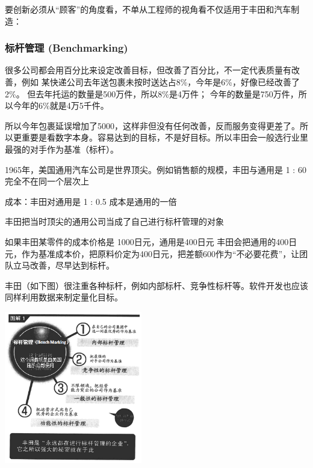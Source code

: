 要创新必须从``顾客''的角度看，不单从工程师的视角看不仅适用于丰田和汽车制造：


\hypertarget{ux6807ux6746ux7ba1ux7406-benchmarking}{%
\subsubsection{标杆管理
(Benchmarking)}\label{ux6807ux6746ux7ba1ux7406-benchmarking}}

很多公司都会用百分比来设定改善目标，但改善了百分比，不一定代表质量有改善，例如
某快递公司去年送包裹未按时送达占8\%，今年是6\%，好像已经改善了2\%。
但去年托运的数量是500万件，所以8\%是4万件；
今年的数量是750万件，所以今年的6\%就是4万5千件。

所以今年包裹延误增加了5000，这样非但没有任何改善，反而服务变得更差了。所以更重要是看数字本身。容易达到的目标，不是好目标。所以丰田会一般选行业里最强的对手作为基准（标杆）。

1965年，美国通用汽车公司是世界顶尖。例如销售额的规模，丰田与通用是 1
: 60 完全不在同一个层次上

成本：丰田对通用是 1 : 0.5 成本是通用的一倍

丰田把当时顶尖的通用公司当成了自己进行标杆管理的对象

如果丰田某零件的成本价格是 1000日元，通用是400日元
丰田会把通用的400日元，作为基准成本价，把原料价定为400日元，把差额600作为``不必要花费''，让团队立马改善，尽早达到标杆。

丰田（如下图）很注重各种标杆，例如内部标杆、竞争性标杆等。软件开发也应该同样利用数据来制定量化目标。

\includegraphics[width=6cm]{丰田p1.png}

